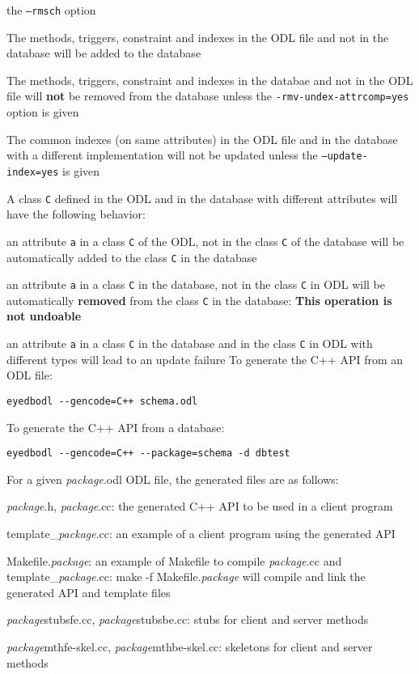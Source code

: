 the \texttt{--rmsch} option
\item The methods, triggers, constraint and indexes
in the ODL file and not in the database will be added to the database
\item The methods, triggers, constraint and indexes in the databae
and not in the ODL file will {\bf not} be removed from the database
unless the \texttt{-rmv-undex-attrcomp=yes} option is given
\item The common indexes (on same attributes) in the ODL file and in the
database with a different implementation will not be updated unless
the \texttt{--update-index=yes} is given
\item A class \texttt{C} defined in the ODL and in the database with
different attributes will have the following behavior:
\bi
\item an attribute \texttt{a} in a class \texttt{C} of the ODL, not
in the class \texttt{C} of the database will be automatically added to the
class \texttt{C} in the database
\item an attribute \texttt{a} in a class \texttt{C} in the database, not
in the class \texttt{C} in ODL will be automatically {\bf removed} from
the class \texttt{C} in the database: {\bf This operation is not undoable}
\item an attribute \texttt{a} in a class \texttt{C} in the database and
in the class \texttt{C} in ODL with different types will lead
to an update failure
\ei
\ei
{}
To generate the C++ API from an ODL file:
\vspace{-2mm}
\begin{verbatim}
eyedbodl --gencode=C++ schema.odl
\end{verbatim}
To generate the C++ API from a database:
\vspace{-2mm}
\begin{verbatim}
eyedbodl --gencode=C++ --package=schema -d dbtest
\end{verbatim}
For a given \emph{package}.odl ODL file, the generated files are as follows:
\bi
\item \emph{package}.h, \emph{package}.cc: the generated C++ API to be used in
a client program
\item template\_\emph{package}.cc: an example of a client program using the generated
API
\item Makefile.\emph{package}: an example of Makefile to compile \emph{package}.cc and
template\_\emph{package}.cc: make -f Makefile.\emph{package} will compile
and link the generated API and template files
\item \emph{package}stubsfe.cc, \emph{package}stubsbe.cc: stubs for client and server methods
\item \emph{package}mthfe-skel.cc, \emph{package}mthbe-skel.cc: skeletons for
client and server methods
\ei

